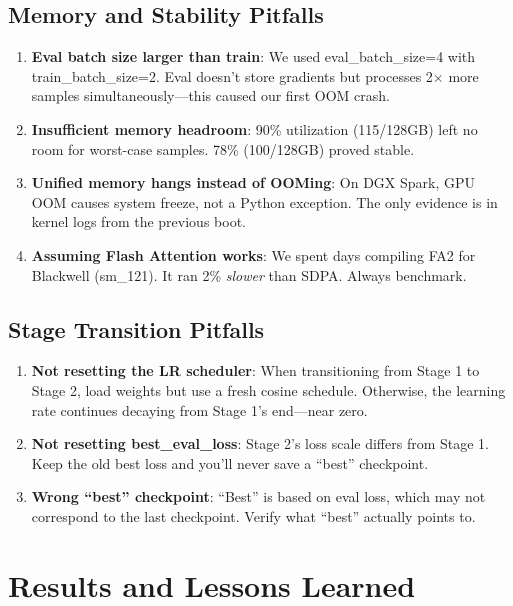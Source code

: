 \documentclass[11pt,a4paper]{article}
\begin{document}
\subsection{Memory and Stability Pitfalls}

\begin{enumerate}
    \item \textbf{Eval batch size larger than train}: We used eval\_batch\_size=4 with train\_batch\_size=2. Eval doesn't store gradients but processes 2$\times$ more samples simultaneously---this caused our first OOM crash.
    \item \textbf{Insufficient memory headroom}: 90\% utilization (115/128GB) left no room for worst-case samples. 78\% (100/128GB) proved stable.
    \item \textbf{Unified memory hangs instead of OOMing}: On DGX Spark, GPU OOM causes system freeze, not a Python exception. The only evidence is in kernel logs from the previous boot.
    \item \textbf{Assuming Flash Attention works}: We spent days compiling FA2 for Blackwell (sm\_121). It ran 2\% \textit{slower} than SDPA. Always benchmark.
\end{enumerate}

\subsection{Stage Transition Pitfalls}

\begin{enumerate}
    \item \textbf{Not resetting the LR scheduler}: When transitioning from Stage 1 to Stage 2, load weights but use a fresh cosine schedule. Otherwise, the learning rate continues decaying from Stage 1's end---near zero.
    \item \textbf{Not resetting best\_eval\_loss}: Stage 2's loss scale differs from Stage 1. Keep the old best loss and you'll never save a ``best'' checkpoint.
    \item \textbf{Wrong ``best'' checkpoint}: ``Best'' is based on eval loss, which may not correspond to the last checkpoint. Verify what ``best'' actually points to.
\end{enumerate}

\section{Results and Lessons Learned}
\end{document}
